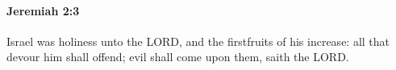 
		\paragraph{Jeremiah 2:3} %
			\label{JEREMIAH-2-3}

			Israel was holiness unto the LORD, and the firstfruits of his increase: all that devour him shall offend; evil shall come upon them, saith the LORD.


